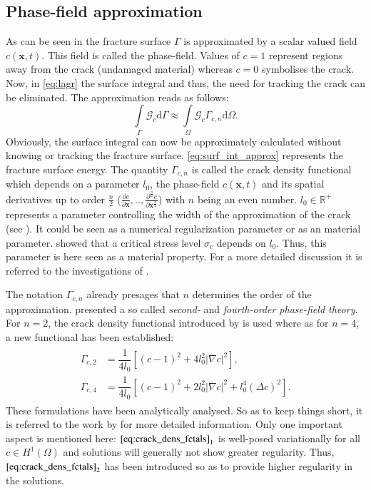 \subsection{Phase-field approximation} \label{sec:ph_approx}
As can be seen in  the fracture surface $\Gamma$ is approximated by a scalar valued field $c\left(\mathbf{x},t\right)$. This field is called the phase-field. Values of $c=1$ represent regions away from the crack (undamaged material) whereas $c=0$ symbolises the crack. Now, in \eqref{eq:lagr} the surface integral and thus, the need for tracking the crack can be eliminated. The approximation reads as follows:
\begin{equation} \label{eq:surf_int_approx}
	\int\limits_{\Gamma}\mathcal{G}_{c}\mathrm{d}\Gamma \approx \int\limits_{\Omega}\mathcal{G}_{c}\Gamma_{c,n}\mathrm{d}\Omega.
\end{equation}
Obviously, the surface integral can now be approximately calculated without knowing or tracking the fracture surface. \eqref{eq:surf_int_approx} represents the fracture surface energy. The quantity $\Gamma_{c,n}$ is called the crack density functional which depends on a parameter $l_{0}$, the phase-field $c\left(\mathbf{x},t\right)$ and its spatial derivatives up to order $\frac{n}{2}$ ($\frac{\partial c}{\partial \mathbf{x}},..,\frac{\partial^{\frac{n}{2}} c}{\partial \mathbf{x}^{\frac{n}{2}}}$) with $n$ being an even number. $l_{0}\in\mathbb{R}^{+}$ represents a parameter controlling the width of the approximation of the crack (see ). It could be seen as a numerical regularization parameter or as an material parameter. \citet{01_PF_dyn_brittle} showed that a critical stress level $\sigma_{c}$ depends on $l_{0}$. Thus, this parameter is here seen as a material property. For a more detailed discussion it is referred to the investigations of \citet{07_PF_l0}.

The notation $\Gamma_{c,n}$ already presages that $n$ determines the order of the approximation. \citet{02_PF_HO_brittle} presented a so called \textit{second-} and \textit{fourth-order phase-field theory}. For $n=2$, the crack density functional introduced by \citet{08_PF_Gammac2} is used where as for $n=4$, a new functional has been established:
\begin{align}
	\begin{aligned}   \label{eq:crack_dens_fctals}
		\Gamma_{c,2} &= \dfrac{1}{4l_{0}}\left[\left(c-1\right)^{2}+4l_{0}^{2}|\nabla c|^{2}\right], \\
		\Gamma_{c,4} &= \dfrac{1}{4l_{0}}\left[\left(c-1\right)^{2}+2l_{0}^{2}|\nabla c|^{2}+l_{0}^{4}\left(\Delta c\right)^{2}\right].
	\end{aligned}
\end{align}
These formulations have been analytically analysed. So as to keep things short, it is referred to the work by \citet{02_PF_HO_brittle} for more detailed information. Only one important aspect is mentioned here: ${\eqref{eq:crack_dens_fctals}}_{1}$ is well-posed variationally for all $c\in H^{1}\left(\Omega\right)$ and solutions will generally not show greater regularity. Thus, ${\eqref{eq:crack_dens_fctals}}_{2}$ has been introduced so as to provide higher regularity in the solutions.

